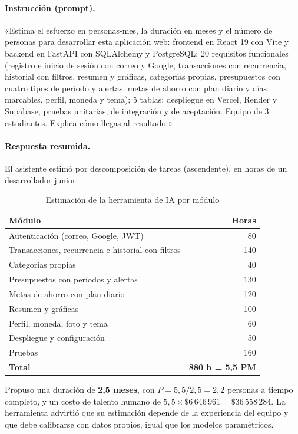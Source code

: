 \paragraph{Instrucción (prompt).} «Estima el esfuerzo en personas-mes, la duración en meses y el número de personas para desarrollar esta aplicación web: frontend en React 19 con Vite y backend en FastAPI con SQLAlchemy y PostgreSQL; 20 requisitos funcionales (registro e inicio de sesión con correo y Google, transacciones con recurrencia, historial con filtros, resumen y gráficas, categorías propias, presupuestos con cuatro tipos de período y alertas, metas de ahorro con plan diario y días marcables, perfil, moneda y tema); 5 tablas; despliegue en Vercel, Render y Supabase; pruebas unitarias, de integración y de aceptación. Equipo de 3 estudiantes. Explica cómo llegas al resultado.»

\paragraph{Respuesta resumida.} El asistente estimó por descomposición de tareas (ascendente), en horas de un desarrollador junior:

\begin{table}[H]
\caption{Estimación de la herramienta de IA por módulo}
\label{tab:ia}
\footnotesize
\begin{tabularx}{\linewidth}{Y r}
\toprule
Módulo & Horas \\
\midrule
Autenticación (correo, Google, JWT) & 80 \\
Transacciones, recurrencia e historial con filtros & 140 \\
Categorías propias & 40 \\
Presupuestos con períodos y alertas & 130 \\
Metas de ahorro con plan diario & 120 \\
Resumen y gráficas & 100 \\
Perfil, moneda, foto y tema & 60 \\
Despliegue y configuración & 50 \\
Pruebas & 160 \\
\midrule
\textbf{Total} & \textbf{880 h = 5,5 PM} \\
\bottomrule
\end{tabularx}
\end{table}

Propuso una duración de \textbf{2,5 meses}, con $P = 5{,}5 / 2{,}5 = 2{,}2$ personas a tiempo completo, y un costo de talento humano de $5{,}5 \times \$6\,646\,961 = \$36\,558\,284$. La herramienta advirtió que su estimación depende de la experiencia del equipo y que debe calibrarse con datos propios, igual que los modelos paramétricos.

